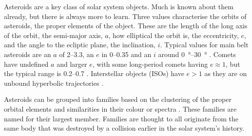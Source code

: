\documentclass{UCreport}
\begin{document}
Asteroids are a key class of solar system objects. Much is known about them already, but there is always more to learn.
Three values characterise the orbits of asteroids, the proper elements of the object.
These are the length of the long axis of the orbit, the semi-major axis, $a$, how elliptical the orbit is, the eccentricity, $e$, and the angle to the ecliptic plane, the inclination, $i$.
Typical values for main belt asteroids are an $a$ of \qtyrange{2}{3.3}{\au}, an $e$ in \qtyrange{0}{0.35}{} and an $i$ around \qtyrange{0}{30}{\degree} \citep{DeMeo2015}.
Comets have undefined $a$ and larger $e$, with some long-period comets having $e\approx 1$, but the typical range is \qtyrange{0.2}{0.7}{} \citep{Lewis2012}.
Interstellar objects (ISOs) have $e>1$ as they are on unbound hyperbolic trajectories \citep{McGlynn1989}.





Asteroids can be grouped into families based on  the  clustering of the proper orbital elements and similarities in their colour or spectra \citep{Nesvorny2015}.
These families are named for their largest member.
Families are thought to all originate from the same body that was destroyed by a collision earlier in the solar system's history.
\end{document}
